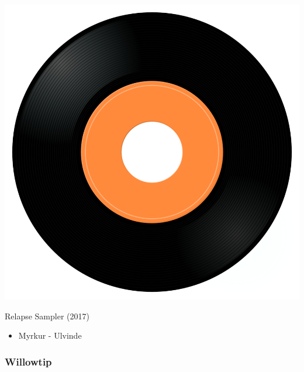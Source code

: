 \begin{minipage}[t]{0.25\textwidth}\vspace{0pt}
\captionsetup{type=figure}
\includegraphics[width=\textwidth]{Images/cover.png}
\caption*{Relapse Sampler (2017)}
\end{minipage}
\begin{minipage}[t]{0.25\textwidth}\vspace{0pt}
\begin{itemize}[nosep,leftmargin=1em,labelwidth=*,align=left]
	\setlength{\itemsep}{0pt}
	\item Myrkur - Ulvinde
\end{itemize}
\end{minipage}

\subsubsection{Willowtip}

